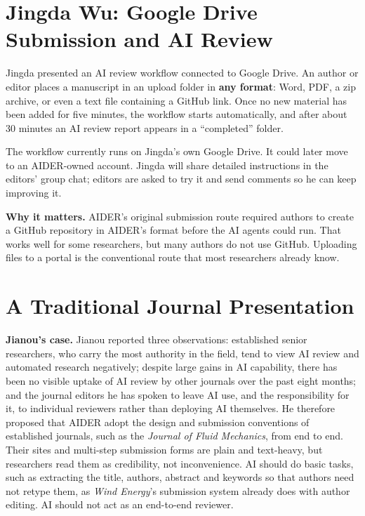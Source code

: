 \documentclass[11pt]{article}
\begin{document}
\section{Jingda Wu: Google Drive Submission and AI Review}

Jingda presented an AI review workflow connected to Google Drive. An author or editor places a manuscript in an upload folder in \textbf{any format}: Word, PDF, a zip archive, or even a text file containing a GitHub link. Once no new material has been added for five minutes, the workflow starts automatically, and after about 30 minutes an AI review report appears in a ``completed'' folder.

The workflow currently runs on Jingda's own Google Drive. It could later move to an AIDER-owned account. Jingda will share detailed instructions in the editors' group chat; editors are asked to try it and send comments so he can keep improving it.

\textbf{Why it matters.} AIDER's original submission route required authors to create a GitHub repository in AIDER's format before the AI agents could run. That works well for some researchers, but many authors do not use GitHub. Uploading files to a portal is the conventional route that most researchers already know.

\section{A Traditional Journal Presentation}

\textbf{Jianou's case.} Jianou reported three observations: established senior researchers, who carry the most authority in the field, tend to view AI review and automated research negatively; despite large gains in AI capability, there has been no visible uptake of AI review by other journals over the past eight months; and the journal editors he has spoken to leave AI use, and the responsibility for it, to individual reviewers rather than deploying AI themselves. He therefore proposed that AIDER adopt the design and submission conventions of established journals, such as the \emph{Journal of Fluid Mechanics}, from end to end. Their sites and multi-step submission forms are plain and text-heavy, but researchers read them as credibility, not inconvenience. AI should do basic tasks, such as extracting the title, authors, abstract and keywords so that authors need not retype them, as \emph{Wind Energy}'s submission system already does with author editing. AI should not act as an end-to-end reviewer.
\end{document}
